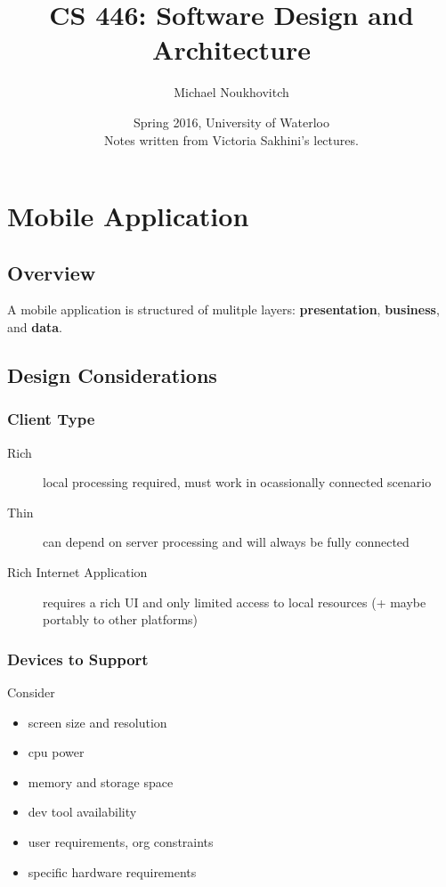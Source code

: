 \documentclass[]{article}
\theoremstyle{definition}
\begin{document}
	\let\ref\Cref

	\title{\bf{CS 446: Software Design and Architecture}}
	\date{Spring 2016, University of Waterloo \\ \center Notes written from Victoria Sakhini's lectures.}
	\author{Michael Noukhovitch}

	\maketitle
	\newpage
	\tableofcontents
	\newpage

	\section{Mobile Application}
	\subsection{Overview}
	A mobile application is structured of mulitple layers: \textbf{presentation}, \textbf{business}, and \textbf{data}. 
	\subsection{Design Considerations}
	\subsubsection{Client Type}
	\begin{description}
		\item[Rich] local processing required, must work in ocassionally connected scenario
		\item[Thin] can depend on server processing and will always be fully connected
		\item[Rich Internet Application] requires a rich UI and only limited access to local resources (+ maybe portably to other platforms)
	\end{description}

	\subsubsection{Devices to Support}
	Consider
	\begin{itemize}
		\item screen size and resolution
		\item cpu power
		\item memory and storage space
		\item dev tool availability
		\item user requirements, org constraints
		\item specific hardware requirements
	\end{itemize}
\end{document}
